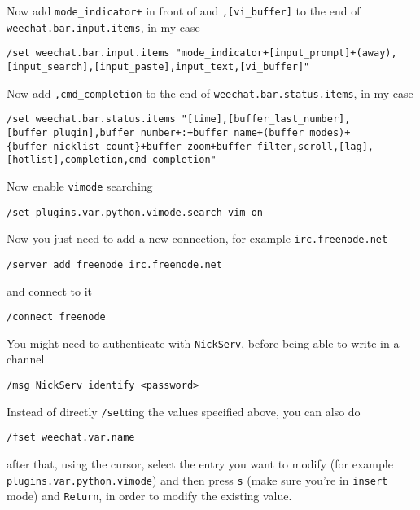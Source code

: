 \documentclass[10pt]{dustdoc}
\begin{document}
Now add \texttt{mode\_indicator+} in front of and \texttt{,[vi\_buffer]} to the end of \texttt{weechat.bar.input.items}, in my case

\begin{verbatim}
/set weechat.bar.input.items "mode_indicator+[input_prompt]+(away),[input_search],[input_paste],input_text,[vi_buffer]"
\end{verbatim}

Now add \texttt{,cmd\_completion} to the end of \texttt{weechat.bar.status.items}, in my case

\begin{verbatim}
/set weechat.bar.status.items "[time],[buffer_last_number],[buffer_plugin],buffer_number+:+buffer_name+(buffer_modes)+{buffer_nicklist_count}+buffer_zoom+buffer_filter,scroll,[lag],[hotlist],completion,cmd_completion"
\end{verbatim}

Now enable \texttt{vimode} searching

\begin{verbatim}
/set plugins.var.python.vimode.search_vim on
\end{verbatim}

Now you just need to add a new connection, for example \texttt{irc.freenode.net}

\begin{verbatim}
/server add freenode irc.freenode.net
\end{verbatim}

\noindent
and connect to it

\begin{verbatim}
/connect freenode
\end{verbatim}

\begin{NOTE}
    You might need to authenticate with \texttt{NickServ}, before being able to write in a channel

    \begin{verbatim}
/msg NickServ identify <password>
    \end{verbatim}
\end{NOTE}
\begin{NOTE}
    Instead of directly \texttt{/set}ting the values specified above, you can also do

    \begin{verbatim}
/fset weechat.var.name
    \end{verbatim}

    \noindent
    after that, using the cursor, select the entry you want to modify (for example \texttt{plugins.var.python.vimode}) and then press \texttt{s} (make sure you’re in \texttt{insert} mode) and \texttt{Return}, in order to modify the existing value.
\end{NOTE}
\end{document}
